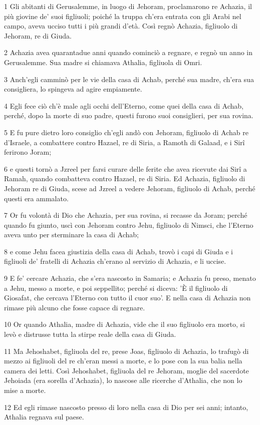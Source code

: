 \par 1 Gli abitanti di Gerusalemme, in luogo di Jehoram, proclamarono re Achazia, il più giovine de' suoi figliuoli; poiché la truppa ch'era entrata con gli Arabi nel campo, aveva ucciso tutti i più grandi d'età. Così regnò Achazia, figliuolo di Jehoram, re di Giuda.
\par 2 Achazia avea quarantadue anni quando cominciò a regnare, e regnò un anno in Gerusalemme. Sua madre si chiamava Athalia, figliuola di Omri.
\par 3 Anch'egli camminò per le vie della casa di Achab, perché sua madre, ch'era sua consigliera, lo spingeva ad agire empiamente.
\par 4 Egli fece ciò ch'è male agli occhi dell'Eterno, come quei della casa di Achab, perché, dopo la morte di suo padre, questi furono suoi consiglieri, per sua rovina.
\par 5 E fu pure dietro loro consiglio ch'egli andò con Jehoram, figliuolo di Achab re d'Israele, a combattere contro Hazael, re di Siria, a Ramoth di Galaad, e i Sirî ferirono Joram;
\par 6 e questi tornò a Jzreel per farsi curare delle ferite che avea ricevute dai Sirî a Ramah, quando combatteva contro Hazael, re di Siria. Ed Achazia, figliuolo di Jehoram re di Giuda, scese ad Jzreel a vedere Jehoram, figliuolo di Achab, perché questi era ammalato.
\par 7 Or fu volontà di Dio che Achazia, per sua rovina, si recasse da Joram; perché quando fu giunto, uscì con Jehoram contro Jehu, figliuolo di Nimsci, che l'Eterno aveva unto per sterminare la casa di Achab;
\par 8 e come Jehu facea giustizia della casa di Achab, trovò i capi di Giuda e i figliuoli de' fratelli di Achazia ch'erano al servizio di Achazia, e li uccise.
\par 9 E fe' cercare Achazia, che s'era nascosto in Samaria; e Achazia fu preso, menato a Jehu, messo a morte, e poi seppellito; perché si diceva: 'È il figliuolo di Giosafat, che cercava l'Eterno con tutto il cuor suo'. E nella casa di Achazia non rimase più alcuno che fosse capace di regnare.
\par 10 Or quando Athalia, madre di Achazia, vide che il suo figliuolo era morto, si levò e distrusse tutta la stirpe reale della casa di Giuda.
\par 11 Ma Jehoshabet, figliuola del re, prese Joas, figliuolo di Achazia, lo trafugò di mezzo ai figliuoli del re ch'eran messi a morte, e lo pose con la sua balia nella camera dei letti. Così Jehoshabet, figliuola del re Jehoram, moglie del sacerdote Jehoiada (era sorella d'Achazia), lo nascose alle ricerche d'Athalia, che non lo mise a morte.
\par 12 Ed egli rimase nascosto presso di loro nella casa di Dio per sei anni; intanto, Athalia regnava sul paese.

